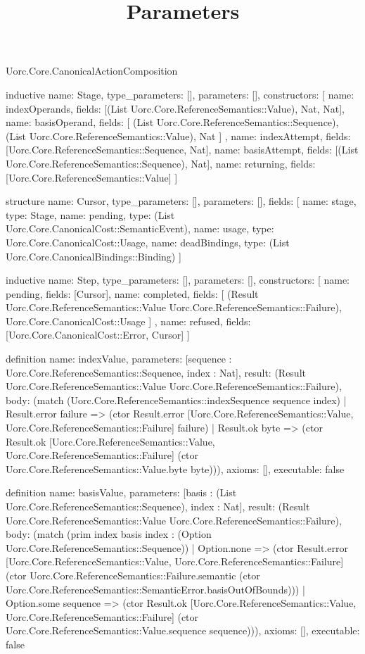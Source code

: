 \begin{lexlean}{Uorc.Core.CanonicalActionComposition}
\title{Parameters}
\begin{semanticmodule}
inductive{
  name: Stage,
  type_parameters: [],
  parameters: [],
  constructors: [
    {name: indexOperands, fields: [(List Uorc.Core.ReferenceSemantics::Value), Nat, Nat]},
    {
      name: basisOperand,
      fields: [
        (List Uorc.Core.ReferenceSemantics::Sequence),
        (List Uorc.Core.ReferenceSemantics::Value),
        Nat
      ]
    },
    {name: indexAttempt, fields: [Uorc.Core.ReferenceSemantics::Sequence, Nat]},
    {name: basisAttempt, fields: [(List Uorc.Core.ReferenceSemantics::Sequence), Nat]},
    {name: returning, fields: [Uorc.Core.ReferenceSemantics::Value]}
  ]
}

structure{
  name: Cursor,
  type_parameters: [],
  parameters: [],
  fields: [
    {name: stage, type: Stage},
    {name: pending, type: (List Uorc.Core.CanonicalCost::SemanticEvent)},
    {name: usage, type: Uorc.Core.CanonicalCost::Usage},
    {name: deadBindings, type: (List Uorc.Core.CanonicalBindings::Binding)}
  ]
}

inductive{
  name: Step,
  type_parameters: [],
  parameters: [],
  constructors: [
    {name: pending, fields: [Cursor]},
    {
      name: completed,
      fields: [
        (Result Uorc.Core.ReferenceSemantics::Value Uorc.Core.ReferenceSemantics::Failure),
        Uorc.Core.CanonicalCost::Usage
      ]
    },
    {name: refused, fields: [Uorc.Core.CanonicalCost::Error, Cursor]}
  ]
}

definition{
  name: indexValue,
  parameters: [sequence : Uorc.Core.ReferenceSemantics::Sequence, index : Nat],
  result: (Result Uorc.Core.ReferenceSemantics::Value Uorc.Core.ReferenceSemantics::Failure),
  body: (match (Uorc.Core.ReferenceSemantics::indexSequence sequence index)
    | Result.error failure => (ctor Result.error [Uorc.Core.ReferenceSemantics::Value, Uorc.Core.ReferenceSemantics::Failure] failure)
    | Result.ok byte => (ctor Result.ok [Uorc.Core.ReferenceSemantics::Value, Uorc.Core.ReferenceSemantics::Failure] (ctor Uorc.Core.ReferenceSemantics::Value.byte byte))),
  axioms: [],
  executable: false
}

definition{
  name: basisValue,
  parameters: [basis : (List Uorc.Core.ReferenceSemantics::Sequence), index : Nat],
  result: (Result Uorc.Core.ReferenceSemantics::Value Uorc.Core.ReferenceSemantics::Failure),
  body: (match (prim index basis index : (Option Uorc.Core.ReferenceSemantics::Sequence))
    | Option.none => (ctor Result.error [Uorc.Core.ReferenceSemantics::Value, Uorc.Core.ReferenceSemantics::Failure] (ctor Uorc.Core.ReferenceSemantics::Failure.semantic (ctor Uorc.Core.ReferenceSemantics::SemanticError.basisOutOfBounds)))
    | Option.some sequence => (ctor Result.ok [Uorc.Core.ReferenceSemantics::Value, Uorc.Core.ReferenceSemantics::Failure] (ctor Uorc.Core.ReferenceSemantics::Value.sequence sequence))),
  axioms: [],
  executable: false
}


\end{semanticmodule}
\end{lexlean}
